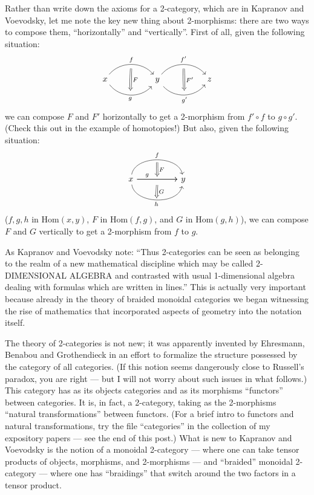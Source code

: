 \documentclass{article}
\begin{document}
Rather than write down the axioms for a 2-category, which are in
Kapranov and Voevodsky, let me note the key new thing about 2-morphisms:
there are two ways to compose them, ``horizontally'' and ``vertically''.
First of all, given the following situation: \[
  \begin{tikzcd}[sep=huge]
    x
      \rar[bend left=50,"f"{name=U}]
      \rar[bend right=50,swap,"g"{name=D}]
    & y
      \rar[bend left=50,"f'"{name=U'}]
      \rar[bend right=50,swap,"g'"{name=D'}]
      \arrow[Rightarrow,shorten=5pt,from=U,to=D,"F"]
    & z
      \arrow[Rightarrow,shorten=5pt,from=U',to=D',"F'"]
  \end{tikzcd}
\] we can compose \(F\) and \(F'\) horizontally to get a 2-morphism from
\(f'\circ f\) to \(g \circ g'\). (Check this out in the example of
homotopies!) But also, given the following situation: \[
  \begin{tikzcd}[sep=huge]
    x
      \rar[bend left=80,"f"{name=U}]
      \rar[""{name=M,below}]
      \rar[near start,"g"]
      \rar[bend right=80,swap,"h"{name=D}]
    & y
      \arrow[Rightarrow,shorten=3pt,from=U,to=M,"F"]
      \arrow[Rightarrow,shorten=2pt,from=M,to=D,"G"]
  \end{tikzcd}
\] (\(f,g,h\) in \(\mathrm{Hom}(x,y)\), \(F\) in \(\mathrm{Hom}(f,g)\),
and \(G\) in \(\mathrm{Hom}(g,h)\)), we can compose \(F\) and \(G\)
vertically to get a 2-morphism from \(f\) to \(g\).

As Kapranov and Voevodsky note: ``Thus 2-categories can be seen as
belonging to the realm of a new mathematical discipline which may be
called 2-DIMENSIONAL ALGEBRA and contrasted with usual 1-dimensional
algebra dealing with formulas which are written in lines.'' This is
actually very important because already in the theory of braided
monoidal categories we began witnessing the rise of mathematics that
incorporated aspects of geometry into the notation itself.

The theory of 2-categories is not new; it was apparently invented by
Ehresmann, Benabou and Grothendieck in an effort to formalize the
structure possessed by the category of all categories. (If this notion
seems dangerously close to Russell's paradox, you are right --- but I
will not worry about such issues in what follows.) This category has as
its objects categories and as its morphisms ``functors'' between
categories. It is, in fact, a 2-category, taking as the 2-morphisms
``natural transformations'' between functors. (For a brief intro to
functors and natural transformations, try the file ``categories'' in the
collection of my expository papers --- see the end of this post.) What
is new to Kapranov and Voevodsky is the notion of a monoidal 2-category
--- where one can take tensor products of objects, morphisms, and
2-morphisms --- and ``braided'' monoidal 2-category --- where one has
``braidings'' that switch around the two factors in a tensor product.
\end{document}
